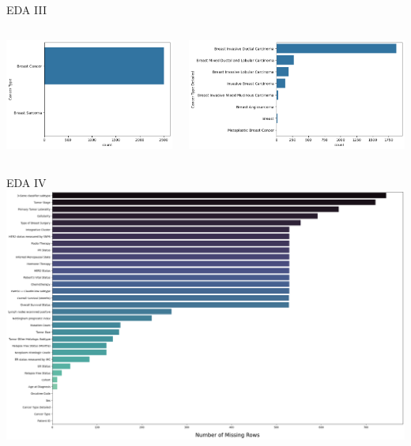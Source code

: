 \documentclass{beamer}
\begin{document}
\begin{frame}{EDA III}
\begin{columns}
    \begin{column}{0.49 \textwidth}
        \centering
        \includegraphics[width = \textwidth]{images/c_type.png}
    \end{column}
    \begin{column}{0.49 \textwidth}
        \centering
        \includegraphics[width = \textwidth]{images/cancer types.png}
    \end{column}
\end{columns}
\end{frame}

\begin{frame}{EDA IV}
    \centering
    \includegraphics[width = \textwidth]{images/missing.png}
\end{frame}
\end{document}
